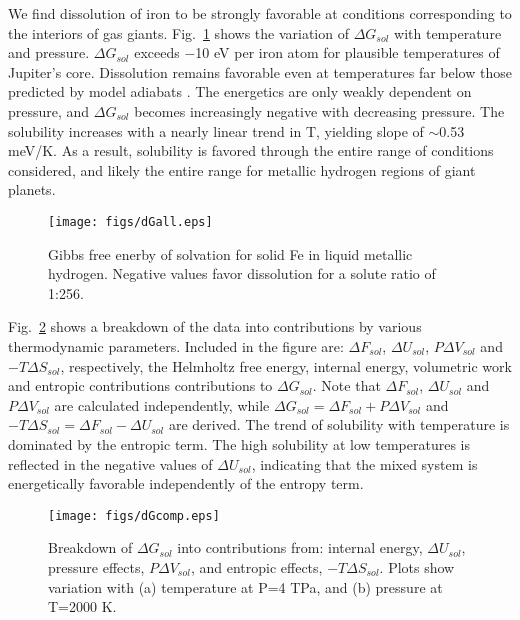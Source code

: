 We find dissolution of iron to be strongly favorable at conditions corresponding to
the interiors of gas giants. Fig.~\ref{fig:dGall}  shows the variation of $\Delta G_{sol}$
with temperature and pressure. $\Delta G_{sol}$ exceeds $-$10 eV per iron atom for
plausible temperatures of Jupiter's core. Dissolution remains favorable even
at temperatures far below those predicted by model adiabats
\citep{militzer2013a,militzer2013b}. The energetics
are only weakly dependent on pressure, and  $\Delta G_{sol}$ becomes increasingly
negative with decreasing pressure. The solubility increases with a nearly
linear trend in T, 
yielding slope of $\sim$0.53 meV/K. As a result, solubility is favored
through the entire range of conditions considered, and likely the entire range
for metallic hydrogen regions of giant planets.

 \begin{figure}[!h] %
   \centering
   \texttt{[image: figs/dGall.eps]} 
\caption{Gibbs free enerby of solvation for solid Fe in liquid metallic
    hydrogen. Negative values favor dissolution for a solute ratio of 1:256. \label{fig:dGall}}
\end{figure}

Fig.~\ref{fig:dGcomp} shows a breakdown of the data into contributions by various
thermodynamic parameters. Included in the figure are: $\Delta F_{sol}$, $\Delta U_{sol}$,
$P\Delta V_{sol}$ and $-T\Delta S_{sol}$, respectively, the Helmholtz free energy, internal
energy, volumetric work and entropic contributions contributions to $\Delta
G_{sol}$. Note that $\Delta F_{sol}$, $\Delta U_{sol}$ and $P\Delta V_{sol}$
are calculated independently, while $\Delta G_{sol}=\Delta F_{sol}+P\Delta
V_{sol}$ and $-T\Delta S_{sol}=\Delta F_{sol}-\Delta U_{sol}$ are derived. 
The trend of solubility with temperature is dominated by the entropic term.
The high solubility at low temperatures is
reflected in the negative values of $\Delta U_{sol}$, indicating that the
mixed system is energetically favorable independently of the entropy term. 

 \begin{figure}[!h] %
   \centering
   \texttt{[image: figs/dGcomp.eps]} 
\caption{Breakdown of $\Delta G_{sol}$ into contributions from: internal
energy,
$\Delta U_{sol}$, pressure effects, $P\Delta V_{sol}$, and entropic effects,
$-T\Delta S_{sol}$. Plots show variation with (a) temperature at P=4 TPa, and
(b) pressure at T=2000 K. \label{fig:dGcomp}}
\end{figure}

